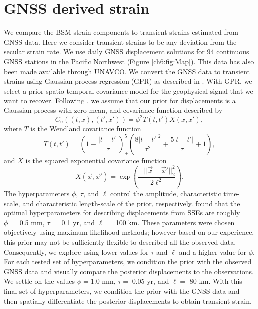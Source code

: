 \section{GNSS derived strain}
We compare the BSM strain components to transient strains estimated
from GNSS data. Here we consider transient strains to be any deviation
from the secular strain rate.  We use daily GNSS displacement
solutions for 94 continuous GNSS stations in the Pacific Northwest
(Figure \ref{ch6:fig:Map}). This data has also been made available through
UNAVCO. We convert the GNSS data to transient strains using Gaussian
process regression (GPR) as described in \citet{Hines2017a}. With GPR,
we select a prior spatio-temporal covariance model for the geophysical
signal that we want to recover. Following \citet{Hines2017a}, we
assume that our prior for displacements is a Gaussian process with
zero mean, and covariance function described by
\begin{equation}\label{cov}
C_u((t,x),(t',x')) = \phi^2 T(t,t')X(x,x'),
\end{equation}        
where $T$ is the Wendland covariance function
\begin{equation}\label{ch6:eq:Wendland}
T(t,t') = \left(1 - \frac{|t - t'|}{\tau}\right)^5_+ \left(\frac{8|t - t'|^2}{\tau^2} + \frac{5|t - t'|}{\tau} + 1\right), 
\end{equation}
and $X$ is the squared exponential covariance function
\begin{equation}\label{ch6:eq:SE}
X(\vec{x},\vec{x}') = \exp\left(\frac{-||\vec{x} - \vec{x}'||_2^2}{2 \ell^2}\right).
\end{equation}
The hyperparameters $\phi$, $\tau$, and $\ell$ control the amplitude,
characteristic time-scale, and characteristic length-scale of the
prior, respectively. \citet{Hines2017a} found that the optimal
hyperparameters for describing displacements from SSEs are roughly
$\phi =$ 0.5 mm, $\tau =$ 0.1 yr, and $\ell =$ 100 km. These
parameters were chosen objectively using maximum likelihood methods;
however based on our experience, this prior may not be sufficiently
flexible to described all the observed data. Consequently, we explore
using lower values for $\tau$ and $\ell$ and a higher value for
$\phi$. For each tested set of hyperparameters, we condition the prior
with the observed GNSS data and visually compare the posterior
displacements to the observations. We settle on the values $\phi =
1.0$ mm, $\tau =$ 0.05 yr, and $\ell =$ 80 km. With this final set of
hyperparameters, we condition the prior with the GNSS data and then
spatially differentiate the posterior displacements to obtain
transient strain.

